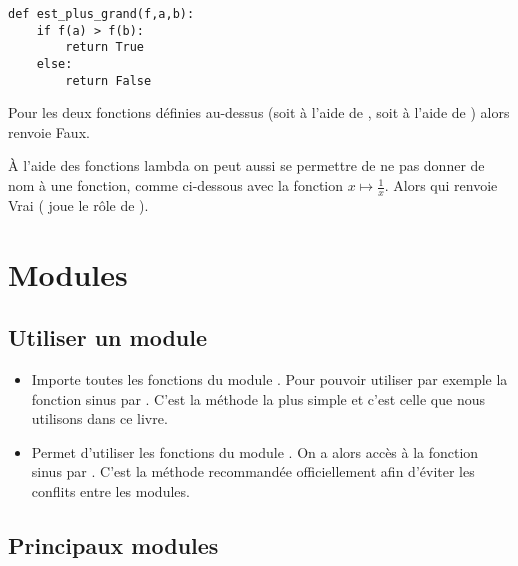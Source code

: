 \documentclass[11pt,class=report,crop=false]{standalone}
\begin{document}
\begin{lstlisting}
def est_plus_grand(f,a,b):
    if f(a) > f(b):
        return True
    else:
        return False  
\end{lstlisting} 



Pour les deux fonctions  définies au-dessus (soit à l'aide de , soit à l'aide de ) alors
renvoie \og{}Faux\fg{}.

\`A l'aide des fonctions lambda on peut aussi se permettre de ne pas donner de nom à une fonction, comme ci-dessous avec la fonction $x \mapsto \frac1x$. Alors
qui renvoie \og{}Vrai\fg{} ( joue le rôle de ).


\section{Modules}

\subsection{Utiliser un module}

\begin{itemize}
  \item {} \quad Importe toutes les fonctions du module . Pour pouvoir utiliser par exemple la fonction sinus par . C'est la méthode la plus simple et c'est celle que nous utilisons dans ce livre.
  
  \item {} \quad Permet d'utiliser les fonctions du module . On a alors accès à la fonction sinus par . C'est la méthode recommandée officiellement afin d'éviter les conflits entre les modules.
\end{itemize}

\subsection{Principaux modules}
\end{document}

